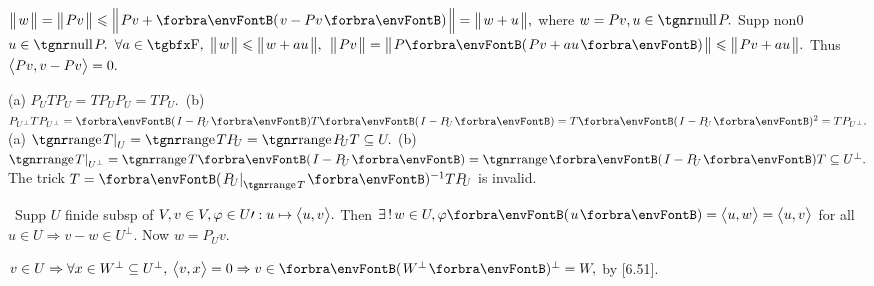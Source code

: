 $\Dvert{w}=\Dvert{Pv}\leqslant\BigDvert{Pv+\Par{v-Pv}}=\Dvert{w+u},$ where $w=Pv,u\in\null P.$ \;Supp non0 $u\in\null P.$\parSol{}
$\forall a\in\Fbb,\;\Dvert{w}\leqslant\Dvert{w+au},$ \Or $\Dvert{Pv}=\Dvert{P\Par{Pv+au}}\leqslant\Dvert{Pv+au}.$ \;Thus $\big\langle{}Pv,v-Pv{}\big\rangle=0.$\PfEnd
\SepLine

(a) $P_{\!U}TP_{\!U}=TP_{\!U}P_{\!U}=TP_{\!U}.$ \,(b) $P_{U^\perp}TP_{U^\perp}=\Par{I-P_{\!U}}T\Par{I-P_{\!U}}=T\Par{I-P_{\!U}}{^2}=TP_{U^\perp}.$\vspace{2pt}\PfEnd\parSol{}
\Or (a) $\range T\mmid_U=\range TP_{\!U}=\range P_{\!U}T\subseteq U.$\parSol{}
\Blind{\Or}(b) $\range T\mmid_{U^\perp}=\range T\Par{I-P_{\!U}}=\range\Par{I-P_{\!U}}T\subseteq U^\perp.$\PfEnd\parSol{}
\Blind{\Or}\AComm The trick $T=\Par{P_{\!U}\mmid_{\range T}}{^{-1}}TP_{\!U}$ is invalid.
\SepLine

\BulletPointX{}\,\,\,Supp $U$ finide subsp of $V,v\in V,\varphi\in U\prime:u\mapsto\big\langle{}u,v{}\big\rangle.$\TextB{}
{}Then $\exists\,!\,w\in U,\varphi\Par{u}=\Ang{u,w}=\Ang{u,v}$ for all $u\in U\Rightarrow v-w\in U^\perp.$ Now $w=P_{\!U}v.$
\SepLine


$v\in U\Rightarrow\forall x\in W^\perp\subseteq U^\perp,\:\Ang{v,x}=0\Rightarrow v\in\Par{W^\perp}{^\perp}=W,$ by [6.51].\PfEnd
\SepLine

